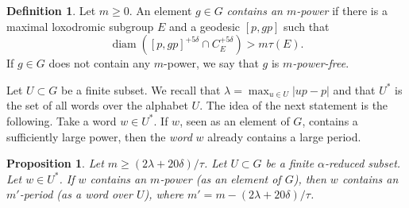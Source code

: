 \documentclass[11pt]{article}
\theoremstyle{plain}
\newtheorem{prop}[thm]{Proposition}
\theoremstyle{definition}
\newtheorem{df}[thm]{Definition}
\DeclareMathOperator{\diam}{diam}
\begin{document}
\begin{df}
\label{def: power-free}
Let $m \geq 0$.
An element $g\in G$ \emph{contains an $m$-power} if there is a maximal loxodromic subgroup $E$ and a geodesic $[p,gp]$ such that
\begin{equation*}
\diam \left( [p,gp]^{+5\delta} \cap C_E^{+5\delta}\right) > m \tau(E).
\end{equation*}
If $g\in G$ does not contain any $m$-power, we say that $g$ is \emph{$m$-power-free}.
\end{df}

Let $U\subset G$ be a finite subset.
We recall that $\lambda = \max_{u\in U}|up-p|$ and that $U^*$ is the set of all words over the alphabet $U$.
The idea of the next statement is the following.
Take a word $w \in U^*$.
If $w$, seen as an element of $G$, contains a sufficiently large power, then the \emph{word} $w$ already contains a large period.

\begin{prop}
\label{P: proper power vs strong period}
Let $m \geq (2\lambda + 20\delta)/\tau$.
Let $U\subset G$ be a finite $\alpha$-reduced subset.
Let $w\in U^*$.
If $w$ contains an $m$-power (as an element of $G$), then $w$ contains an $m'$-period (as a word over $U$), where $m' = m - (2\lambda + 20\delta)/\tau$.
\end{prop}
\end{document}
